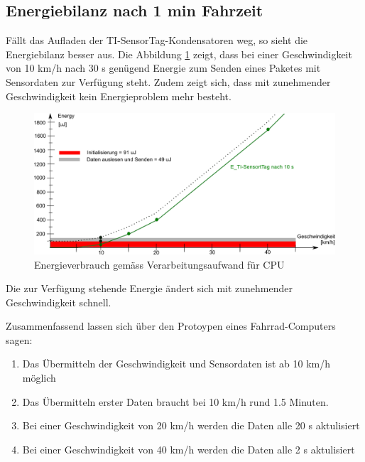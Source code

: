 
\subsection{Energiebilanz nach 1 min Fahrzeit}

Fällt das Aufladen der TI-SensorTag-Kondensatoren weg, so sieht die Energiebilanz besser aus. Die Abbildung \ref{r_bild_e_zusammenfassung_ohneSockel} zeigt, dass bei einer Geschwindigkeit von 10 km/h nach 30 s genügend Energie zum Senden eines Paketes mit Sensordaten zur Verfügung steht. Zudem zeigt sich, dass mit zunehmender Geschwindigkeit kein Energieproblem mehr besteht. 


\begin{figure}[ht]
     \includegraphics[width=1\textwidth]{4Resultate/imag/EnergyVerbrauchZusammenfassung_ohneSockel.png}
     \caption{Energieverbrauch gem\"{a}ss Verarbeitungsaufwand für CPU}
     \label{r_bild_e_zusammenfassung_ohneSockel}
\end{figure}

Die zur Verfügung stehende Energie ändert sich mit zunehmender Geschwindigkeit schnell.

Zusammenfassend lassen sich über den Protoypen eines Fahrrad-Computers sagen:

\begin{minipage}{\textwidth}
    \begin{enumerate}
    \item Das Übermitteln der Geschwindigkeit und Sensordaten ist ab 10 km/h möglich
    \item Das Übermitteln erster Daten braucht bei 10 km/h rund 1.5 Minuten.
    \item Bei einer Geschwindigkeit von 20 km/h werden die Daten alle 20 s aktulisiert
    \item Bei einer Geschwindigkeit von 40 km/h werden die Daten alle 2 s aktulisiert
    \end{enumerate}
\end{minipage}


